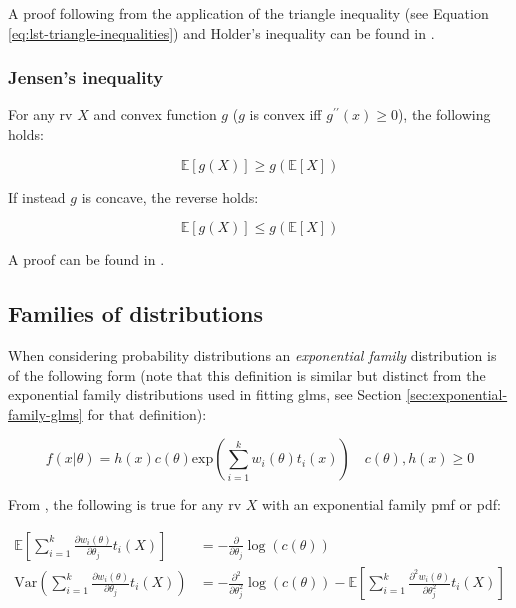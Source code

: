 \documentclass{report}
\begin{document}
A proof following from the application of the triangle inequality (see Equation \ref{eq:lst-triangle-inequalities}) and Holder's inequality can be found in \cite[Chapter~4.7.1]{casella_statistical_2002}. 

\subsubsection{Jensen's inequality}

For any \gls{rv} $X$ and convex function $g$ ($g$ is convex \gls{iff} $g^{\prime\prime}(x) \geq 0$), the following holds:

\begin{equation}\label{eq:jensens-inequality-1}
    \mathbb{E}[g(X)] \geq g(\mathbb{E}[X])
\end{equation}

If instead $g$ is concave, the reverse holds:

\begin{equation}\label{eq:jensens-inequality-2}
    \mathbb{E}[g(X)] \leq g(\mathbb{E}[X])
\end{equation}

A proof can be found in \cite[Chapter~4.7.2]{casella_statistical_2002}. 

\subsection{Families of distributions}

When considering probability distributions an \textit{exponential family} distribution is of the following form (note that this definition is similar but distinct from the exponential family distributions used in fitting \glspl{glm}, see Section \ref{sec:exponential-family-glms} for that definition):

\begin{equation}\label{eq:exponential-family-dist}
    f(x | \theta) = h(x) c(\theta) \text{exp} \left(\sum_{i=1}^k w_i(\theta) t_i(x)\right) \quad c(\theta), h(x) \geq 0 
\end{equation}

From \cite[Chapter~3.4]{casella_statistical_2002}, the following is true for any \gls{rv} $X$ with an exponential family \gls{pmf} or \gls{pdf}:

\begin{equation}\label{eq:exponential-family-properties}
    \begin{aligned}
        \mathbb{E}\left[\sum_{i=1}^k \frac{\partial w_i(\theta)}{\partial\theta_j}t_i(X)\right] &= -\frac{\partial}{\partial\theta_j} \log(c(\theta)) \\
        \text{Var}\left(\sum_{i=1}^k \frac{\partial w_i(\theta)}{\partial\theta_j}t_i(X)\right) &= -\frac{\partial^2}{\partial\theta_j^2} \log(c(\theta)) - \mathbb{E}\left[\sum_{i=1}^k \frac{\partial^2w_i(\theta)}{\partial\theta_j^2} t_i(X)\right] \\
    \end{aligned}
\end{equation}
\end{document}
